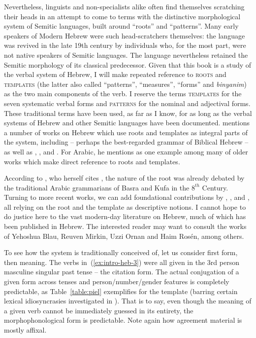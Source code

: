 \begin{exe}
\begin{xlist}
\begin{exe}
\begin{exe}
\begin{exe}
\begin{exe}
\begin{xlist}
\begin{exe}
\begin{xlist}
\begin{xlist}
\begin{xlist}
\begin{exe}
\begin{xlist}
Nevertheless, linguists and non-specialists alike often find themselves scratching their heads in an attempt to come to terms with the distinctive morphological system of Semitic languages, built around ``roots'' and ``patterns''. Many early speakers of Modern Hebrew were such head-scratchers themselves: the language was revived in the late 19th century by individuals who, for the most part, were not native speakers of Semitic languages. The language nevertheless retained the Semitic morphology of its classical predecessor.
Given that this book is a study of the verbal system of Hebrew, I will make repeated reference to \textsc{roots} and \textsc{templates} (the latter also called ``patterns'', ``measures'', ``forms'' and \emph{binyanim}) as the two main components of the verb. I reserve the terms \textsc{templates} for the seven systematic verbal forms and \textsc{patterns} for the nominal and adjectival forms. These traditional terms have been used, as far as I know, for as long as the verbal systems of Hebrew and other Semitic languages have been documented. \cite{ussishkin00phd} mentions a number of works on Hebrew which use roots and templates as integral parts of the system, including \cite{gesenius} -- perhaps the best-regarded grammar of Biblical Hebrew -- as well as \cite{bopp1824}, \cite{ewald1827}, \cite{harris41} and \cite{chomsky51}. For Arabic, he mentions \cite{desacy1810} as one example among many of older works which make direct reference to roots and templates.

According to \citet[563ff]{borer13oup}, who herself cites \cite{owens88}, the nature of the root was already debated by the traditional Arabic grammarians of Basra and Kufa in the $8^{th}$ Century. Turning to more recent works, we can add foundational contributions by \cite{rosen77}, \cite{berman78}, \cite{bolozky78,bolozky99} and \cite{ravid90}, all relying on the root and the template as descriptive notions. I cannot hope to do justice here to the vast modern-day literature on Hebrew, much of which has been published in Hebrew. The interested reader may want to consult the works of Yehoshua Blau, Reuven Mirkin, Uzzi Ornan and Haim Ros\'en, among others.

To see how the system is traditionally conceived of, let us consider first form, then meaning. The verbs in~(\ref{ex:intro-heb-3}) were all given in the 3rd person masculine singular past tense -- the citation form. The actual conjugation of a given form across tenses and person/number/gender features is completely predictable, as Table~\ref{table:piel} exemplifies for the {\tpie} template (barring certain lexical idiosyncrasies investigated in \citealt{kastner18nllt}). That is to say, even though the meaning of a given verb cannot be immediately guessed in its entirety, the morphophonological form is predictable. Note again how agreement material is mostly affixal.


\end{xlist}
\end{exe}
\end{xlist}
\end{xlist}
\end{xlist}
\end{exe}
\end{xlist}
\end{exe}
\end{exe}
\end{exe}
\end{exe}
\end{xlist}
\end{exe}

